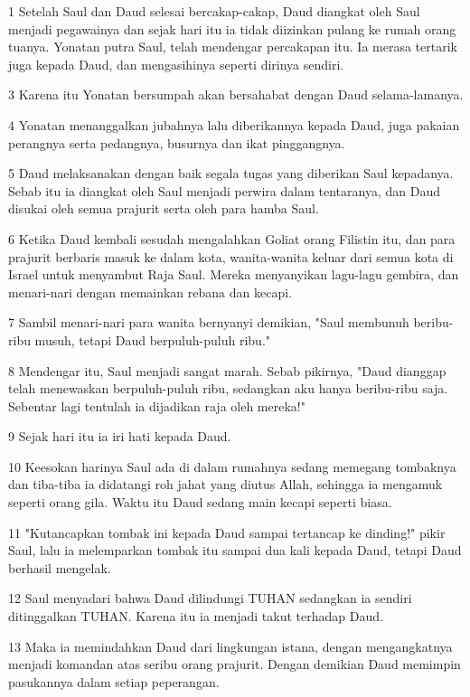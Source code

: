 \par 1 Setelah Saul dan Daud selesai bercakap-cakap, Daud diangkat oleh Saul menjadi pegawainya dan sejak hari itu ia tidak diizinkan pulang ke rumah orang tuanya. Yonatan putra Saul, telah mendengar percakapan itu. Ia merasa tertarik juga kepada Daud, dan mengasihinya seperti dirinya sendiri.
\par 3 Karena itu Yonatan bersumpah akan bersahabat dengan Daud selama-lamanya.
\par 4 Yonatan menanggalkan jubahnya lalu diberikannya kepada Daud, juga pakaian perangnya serta pedangnya, busurnya dan ikat pinggangnya.
\par 5 Daud melaksanakan dengan baik segala tugas yang diberikan Saul kepadanya. Sebab itu ia diangkat oleh Saul menjadi perwira dalam tentaranya, dan Daud disukai oleh semua prajurit serta oleh para hamba Saul.
\par 6 Ketika Daud kembali sesudah mengalahkan Goliat orang Filistin itu, dan para prajurit berbaris masuk ke dalam kota, wanita-wanita keluar dari semua kota di Israel untuk menyambut Raja Saul. Mereka menyanyikan lagu-lagu gembira, dan menari-nari dengan memainkan rebana dan kecapi.
\par 7 Sambil menari-nari para wanita bernyanyi demikian, "Saul membunuh beribu-ribu musuh, tetapi Daud berpuluh-puluh ribu."
\par 8 Mendengar itu, Saul menjadi sangat marah. Sebab pikirnya, "Daud dianggap telah menewaskan berpuluh-puluh ribu, sedangkan aku hanya beribu-ribu saja. Sebentar lagi tentulah ia dijadikan raja oleh mereka!"
\par 9 Sejak hari itu ia iri hati kepada Daud.
\par 10 Keesokan harinya Saul ada di dalam rumahnya sedang memegang tombaknya dan tiba-tiba ia didatangi roh jahat yang diutus Allah, sehingga ia mengamuk seperti orang gila. Waktu itu Daud sedang main kecapi seperti biasa.
\par 11 "Kutancapkan tombak ini kepada Daud sampai tertancap ke dinding!" pikir Saul, lalu ia melemparkan tombak itu sampai dua kali kepada Daud, tetapi Daud berhasil mengelak.
\par 12 Saul menyadari bahwa Daud dilindungi TUHAN sedangkan ia sendiri ditinggalkan TUHAN. Karena itu ia menjadi takut terhadap Daud.
\par 13 Maka ia memindahkan Daud dari lingkungan istana, dengan mengangkatnya menjadi komandan atas seribu orang prajurit. Dengan demikian Daud memimpin pasukannya dalam setiap peperangan.
